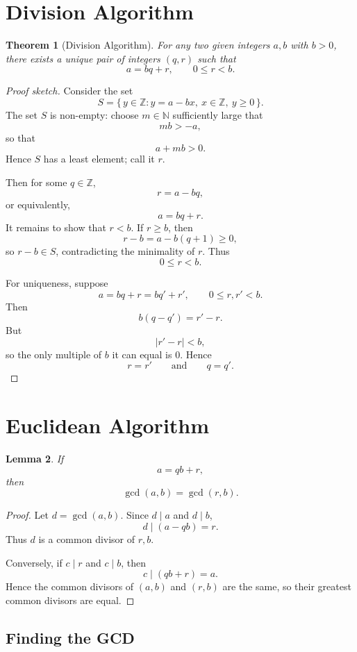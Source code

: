 \documentclass[11pt]{article}
\newtheorem{theorem}{Theorem}[section]
\newtheorem{lemma}[theorem]{Lemma}
\theoremstyle{remark}
\DeclareMathOperator{\gcdop}{gcd}
\newcommand{\Z}{\mathbb Z}
\newcommand{\N}{\mathbb N}
\begin{document}
\section{Division Algorithm}

\begin{theorem}[Division Algorithm]
For any two given integers $a,b$ with $b>0$, there exists a unique pair
of integers $(q,r)$ such that
\[
    a=bq+r,
    \qquad
    0\le r<b.
\]
\end{theorem}

\begin{proof}[Proof sketch]
Consider the set
\[
    S=\{\,y\in\Z:y=a-bx,\ x\in\Z,\ y\ge0\,\}.
\]
The set $S$ is non-empty: choose $m\in\N$ sufficiently large that
\[
    mb>-a,
\]
so that
\[
    a+mb>0.
\]
Hence $S$ has a least element; call it $r$.

Then for some $q\in\Z$,
\[
    r=a-bq,
\]
or equivalently,
\[
    a=bq+r.
\]
It remains to show that $r<b$. If $r\ge b$, then
\[
    r-b=a-b(q+1)\ge0,
\]
so $r-b\in S$, contradicting the minimality of $r$. Thus
\[
    0\le r<b.
\]

For uniqueness, suppose
\[
    a=bq+r=bq'+r',
    \qquad
    0\le r,r'<b.
\]
Then
\[
    b(q-q')=r'-r.
\]
But
\[
    |r'-r|<b,
\]
so the only multiple of $b$ it can equal is $0$. Hence
\[
    r=r'
    \qquad\text{and}\qquad
    q=q'.
\]
\end{proof}

\section{Euclidean Algorithm}

\begin{lemma}
If
\[
    a=qb+r,
\]
then
\[
    \gcdop(a,b)=\gcdop(r,b).
\]
\end{lemma}

\begin{proof}
Let $d=\gcdop(a,b)$. Since $d\mid a$ and $d\mid b$,
\[
    d\mid(a-qb)=r.
\]
Thus $d$ is a common divisor of $r,b$.

Conversely, if $c\mid r$ and $c\mid b$, then
\[
    c\mid(qb+r)=a.
\]
Hence the common divisors of $(a,b)$ and $(r,b)$ are the same, so their
greatest common divisors are equal.
\end{proof}

\subsection{Finding the GCD}
\end{document}
